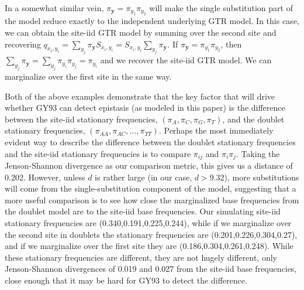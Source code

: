 \documentclass[11pt]{article}
\begin{document}
In a somewhat similar vein, $\pi_{\boldsymbol{y}} = \pi_{y_1} \pi_{y_2}$ will make the single substitution part of the model reduce exactly to the independent underlying GTR model.
In this case, we can obtain the site-iid GTR model by summing over the second site and recovering $q_{x_i,y_i} = \sum_{y_j} \pi_{\boldsymbol{y}} S_{x_i, y_i} = S_{x_i, y_i} \sum_{y_j} \pi_{\boldsymbol{y}}$.
If $\pi_{\boldsymbol{y}} = \pi_{y_1} \pi_{y_2}$, then $\sum_{y_j} \pi_{\boldsymbol{y}} = \sum_{y_j} \pi_{y_i} \pi_{y_j} = \pi_{y_i}$ and we recover the site-iid GTR model.
We can marginalize over the first site in the same way.

Both of the above examples demonstrate that the key factor that will drive whether GY93 can detect epistasis (as modeled in this paper) is the difference between the site-iid stationary frequencies, $(\pi_A,\pi_C,\pi_G,\pi_T)$, and the doublet stationary frequencies, $(\pi_{AA},\pi_{AC},\dots,\pi_{TT})$.
Perhaps the most immediately evident way to describe the difference between the doublet stationary frequencies and the site-iid stationary frequencies is to compare $\pi_{ij}$ and $\pi_i \pi_j$.
Taking the Jenson-Shannon divergence as our comparison metric, this gives us a distance of 0.202.
However, unless $d$ is rather large (in our case, $d > 9.32$), more substitutions will come from the single-substitution component of the model, suggesting that a more useful comparison is to see how close the marginalized base frequencies from the doublet model are to the site-iid base frequencies.
Our simulating site-iid stationary frequencies are (0.340,0.191,0.225,0.244), while if we marginalize over the second site in doublets the stationary frequencies are (0.201,0.226,0.304,0.27), and if we marginalize over the first site they are (0.186,0.304,0.261,0.248).
While these stationary frequencies are different, they are not hugely different, only Jenson-Shannon divergences of 0.019 and 0.027 from the site-iid base frequencies, close enough that it may be hard for GY93 to detect the difference.
\end{document}
